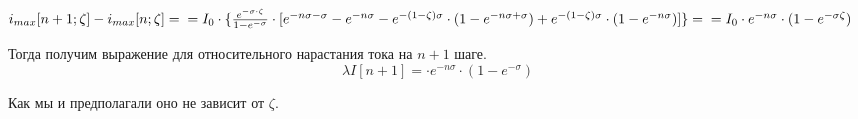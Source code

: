 $ i_{max}[n+1; \zeta] - i_{max}[n; \zeta] = \\
\newline \newline
  = I_{0} 
    \cdot \{ \frac{ e^{-\sigma \cdot \zeta} }{ 1 - e^{-\sigma} } 
                \cdot [ e^{-n\sigma-\sigma}
                        -e^{-n\sigma}
                        -e^{-( 1-\zeta )\sigma} \cdot ( 1-e^{-n\sigma+\sigma} )
                        +e^{-(1-\zeta)\sigma} \cdot (1-e^{-n\sigma})
                      ] 
          \} =
\newline \newline
  = I_{0} 
    \cdot e^{-n\sigma}
    \cdot (1-e^{-\sigma\zeta}) 
$
\newline

Тогда получим выражение для относительного нарастания тока на $n+1$ шаге.
\begin{equation}
    \label{relative_current_increasing_in_the_n_pwm_pulse}
    \lambda I[n+1] = 
        \cdot e^{-n\sigma}
        \cdot (1-e^{-\sigma})
\end{equation}

Как мы и предполагали оно не зависит от $\zeta$.



